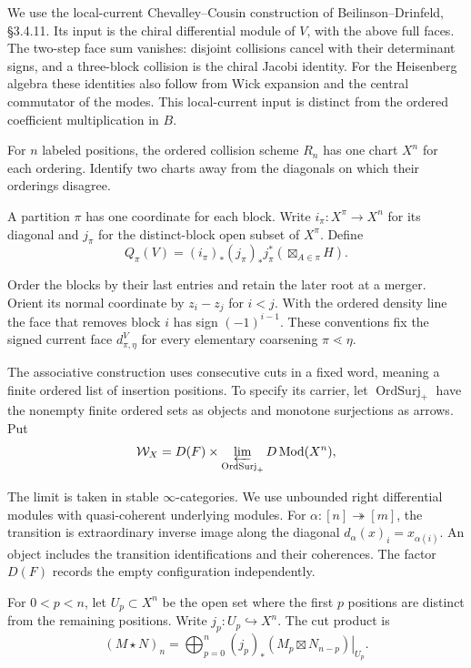We use the local-current Chevalley--Cousin construction of
Beilinson--Drinfeld, \S3.4.11. Its input is the chiral differential module of $V$,
with the above full faces. The two-step face sum vanishes: disjoint
collisions cancel with their determinant signs, and a three-block
collision is the chiral Jacobi identity. For the Heisenberg algebra these
identities also follow from Wick expansion and the central commutator of
the modes. This local-current input is distinct from the ordered
coefficient multiplication in $B$.

For $n$ labeled positions, the ordered collision scheme $R_n$ has one
chart $X^n$ for each ordering. Identify two charts away from the diagonals
on which their orderings disagree.

A partition $\pi$ has
one coordinate for each block. Write $i_\pi:X^\pi\to X^n$ for its diagonal
and $j_\pi$ for the distinct-block open subset of $X^\pi$. Define
\[
 Q_\pi(V)=(i_\pi)_*(j_\pi)_*j_\pi^*
       \left(\boxtimes_{A\in\pi}H\right).
\]

Order the blocks by their last entries and retain the later root at a
merger. Orient its normal coordinate by $z_i-z_j$ for $i<j$.
With the ordered density line the face that removes block $i$ has sign
$(-1)^{i-1}$. These conventions fix the signed current face
$d^V_{\pi,\eta}$ for every elementary coarsening $\pi\lessdot\eta$.

The associative construction uses consecutive cuts in a fixed word,
meaning a finite ordered list of insertion positions.
To specify its carrier, let $\operatorname{OrdSurj}_+$ have the nonempty
finite ordered sets as objects and monotone surjections as arrows. Put
\[
 \mathcal W_X=D(F)\times
 \varprojlim_{\operatorname{OrdSurj}_+}D\operatorname{Mod}(X^n),
\]

The limit is taken in stable $\infty$-categories. We use unbounded right
differential modules with quasi-coherent underlying modules.
For $\alpha:[n]\twoheadrightarrow[m]$, the transition is
extraordinary inverse image along the diagonal
$d_\alpha(x)_i=x_{\alpha(i)}$. An object includes the transition
identifications and their coherences. The factor $D(F)$ records the empty
configuration independently.

For $0<p<n$, let $U_p\subset X^n$ be the open set where the first $p$
positions are distinct from the remaining positions.
Write $j_p:U_p\hookrightarrow X^n$. The cut product is
\[
 (M\star N)_n=
 \bigoplus_{p=0}^n(j_p)_*
       \left.(M_p\boxtimes N_{n-p})\right|_{U_p}.
\]

